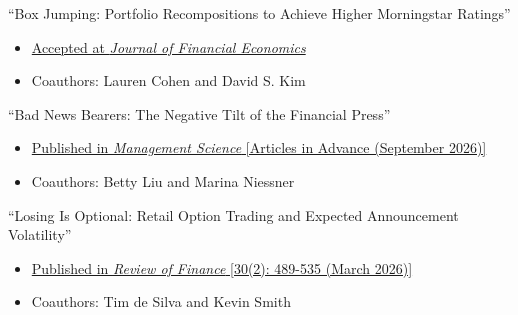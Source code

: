 
\pagebreak[0]
\begin{samepage}
\item ``Box Jumping: Portfolio Recompositions to Achieve Higher Morningstar Ratings''
\begin{itemize}
\vspace*{-.07in}
	\item \href{https://doi.org/10.2139/ssrn.4971228}{Accepted at {\it Journal of Financial Economics}}
	\vspace*{-.07in}
	\item Coauthors: Lauren Cohen and David S. Kim

\end{itemize}
\end{samepage}
\vskip 0.08cm

\pagebreak[0]
\begin{samepage}
\item ``Bad News Bearers: The Negative Tilt of the Financial Press''
\begin{itemize}
\vspace*{-.07in}
	\item \href{https://doi.org/10.1287/mnsc.2023.00580}{Published in {\it Management Science} [Articles in Advance (September 2026)]}
	\vspace*{-.07in}
	\item Coauthors: Betty Liu and Marina Niessner

\end{itemize}
\end{samepage}
\vskip 0.08cm


\pagebreak[0]
\begin{samepage}
\item ``Losing Is Optional: Retail Option Trading and Expected Announcement Volatility''
\begin{itemize}
\vspace*{-.07in}
	\item \href{https://doi.org/10.1093/rof/rfaf052}{Published in {\it Review of Finance} [30(2): 489-535 (March 2026)]}
	\vspace*{-.07in}
	\item Coauthors: Tim de Silva and Kevin Smith

\end{itemize}
\end{samepage}
\vskip 0.08cm


